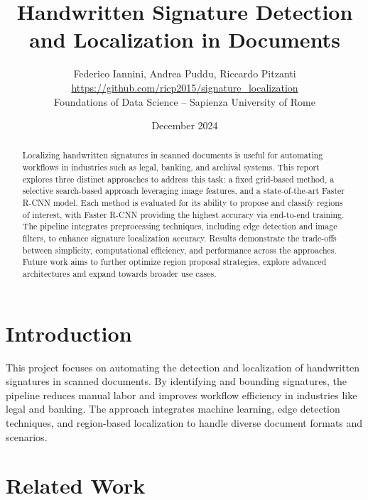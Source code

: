 \documentclass[a4paper,12pt]{article}
\begin{document}
\title{Handwritten Signature Detection and Localization in Documents}
\author{Federico Iannini, Andrea Puddu, Riccardo Pitzanti \\
\small \href{https://github.com/ricp2015/signature_localization}{https://github.com/ricp2015/signature\_localization}
\\
\small Foundations of Data Science – Sapienza University of Rome}
\date{December 2024}

\maketitle

\begin{abstract}
Localizing handwritten signatures in scanned documents is useful for automating workflows in industries such as legal, banking, and archival systems. This report explores three distinct approaches to address this task: a fixed grid-based method, a selective search-based approach leveraging image features, and a state-of-the-art Faster R-CNN model. Each method is evaluated for its ability to propose and classify regions of interest, with Faster R-CNN providing the highest accuracy via end-to-end training. The pipeline integrates preprocessing techniques, including edge detection and image filters, to enhance signature localization accuracy. Results demonstrate the trade-offs between simplicity, computational efficiency, and performance across the approaches. Future work aims to further optimize region proposal strategies, explore advanced architectures and expand towards broader use cases.
\end{abstract}

\section{Introduction}
This project focuses on automating the detection and localization of handwritten signatures in scanned documents. By identifying and bounding signatures, the pipeline reduces manual labor and improves workflow efficiency in industries like legal and banking. The approach integrates machine learning, edge detection techniques, and region-based localization to handle diverse document formats and scenarios. 

\section{Related Work}
\end{document}
